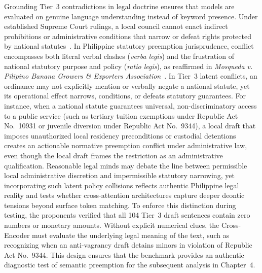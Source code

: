     Grounding Tier~3 contradictions in legal doctrine ensures that models are evaluated on genuine language understanding instead of keyword presence. Under established Supreme Court rulings, a local council cannot enact indirect prohibitions or administrative conditions that narrow or defeat rights protected by national statutes~\cite{scp1994magtajasvpryce, scp2005manilavlaguio}. In Philippine statutory preemption jurisprudence, conflict encompasses both literal verbal clashes (\textit{verba legis}) and the frustration of national statutory purpose and policy (\textit{ratio legis}), as reaffirmed in \textit{Mosqueda v. Pilipino Banana Growers \& Exporters Association}~\cite{scp2016mosqueda}. In Tier~3 latent conflicts, an ordinance may not explicitly mention or verbally negate a national statute, yet its operational effect narrows, conditions, or defeats statutory guarantees. For instance, when a national statute guarantees universal, non-discriminatory access to a public service (such as tertiary tuition exemptions under Republic Act No.~10931 or juvenile diversion under Republic Act No.~9344), a local draft that imposes unauthorized local residency preconditions or custodial detentions creates an actionable normative preemption conflict under administrative law, even though the local draft frames the restriction as an administrative qualification. Reasonable legal minds may debate the line between permissible local administrative discretion and impermissible statutory narrowing, yet incorporating such latent policy collisions reflects authentic Philippine legal reality and tests whether cross-attention architectures capture deeper deontic tensions beyond surface token matching. To enforce this distinction during testing, the proponents verified that all 104 Tier~3 draft sentences contain zero numbers or monetary amounts. Without explicit numerical clues, the Cross-Encoder must evaluate the underlying legal meaning of the text, such as recognizing when an anti-vagrancy draft detains minors in violation of Republic Act No.~9344. This design ensures that the benchmark provides an authentic diagnostic test of semantic preemption for the subsequent analysis in Chapter~4.

